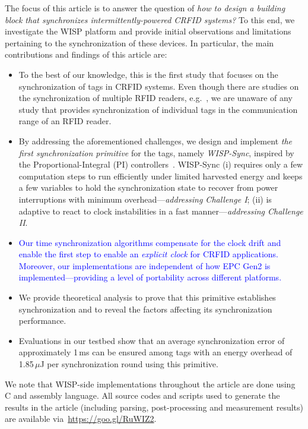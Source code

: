 \documentclass[10pt,journal,compsoc]{IEEEtran}
\newcommand{\add}[1]{\textcolor{blue}{#1}}
\begin{document}
The focus of this article is to answer the question of \emph{how to design a building block that synchronizes intermittently-powered CRFID systems?} To this end, we investigate the WISP platform and provide initial observations and limitations pertaining to the synchronization of these devices. In particular, the main contributions and findings of 
this article are:
%
\begin{itemize}
	\item To the best of our knowledge, this is the first study that focuses on the synchronization of tags in CRFID systems. Even though there are studies on the synchronization of multiple RFID readers, e.g.~\cite{reader_sync}, we are unaware of any study that provides synchronization of individual tags in the communication range of an RFID reader. 
	\item By addressing the aforementioned challenges, we design and implement \emph{the first synchronization primitive} for the tags, namely \emph{WISP-Sync}, inspired by the Proportional-Integral (PI) controllers~\cite{pi2015,yildirim2017adaptive}. WISP-Sync (i) 
	requires only a few computation steps to run efficiently under limited harvested energy and keeps a few variables to hold the synchronization state to recover from power interruptions with minimum overhead---\emph{addressing Challenge I}; (ii) is adaptive to react to clock instabilities in a fast manner---\emph{addressing Challenge II}.
	\item \add{Our time synchronization algorithms compensate for the clock drift and enable the first step to enable an \emph{explicit clock} for CRFID applications. Moreover, our implementations are independent of how EPC Gen2 is implemented---providing a level of portability across different platforms.}
	\item We provide theoretical analysis to prove that this primitive establishes synchronization and to reveal the factors affecting its synchronization performance.
	\item Evaluations in our testbed show that an average synchronization error of approximately 1\,ms can be ensured among tags with an energy overhead of 1.85\,$\mu$J per synchronization round using this  primitive.
\end{itemize}
%
We note that WISP-side implementations throughout the article are done using C and assembly language. All source codes and scripts used to generate the results in the article (including parsing, post-processing and measurement results) are available via~\href{https://goo.gl/RuWIZ2}{https://goo.gl/RuWIZ2}.
\end{document}

